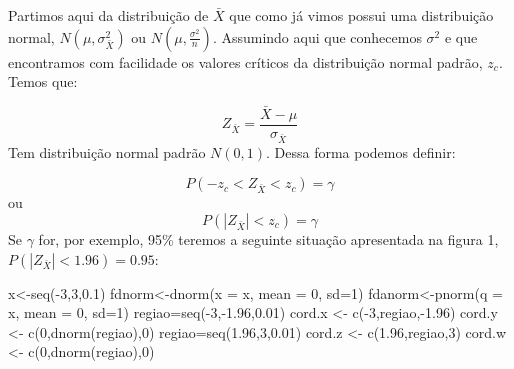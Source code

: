 \documentclass[
  letterpaper,
  DIV=11,
  numbers=noendperiod]{scrartcl}
\newenvironment{Shaded}{\begin{snugshade}}{\end{snugshade}}
\newcommand{\AttributeTok}[1]{\textcolor[rgb]{0.40,0.45,0.13}{#1}}
\newcommand{\DecValTok}[1]{\textcolor[rgb]{0.68,0.00,0.00}{#1}}
\newcommand{\FloatTok}[1]{\textcolor[rgb]{0.68,0.00,0.00}{#1}}
\newcommand{\FunctionTok}[1]{\textcolor[rgb]{0.28,0.35,0.67}{#1}}
\newcommand{\NormalTok}[1]{\textcolor[rgb]{0.00,0.23,0.31}{#1}}
\newcommand{\OtherTok}[1]{\textcolor[rgb]{0.00,0.23,0.31}{#1}}
\newcommand{\SpecialCharTok}[1]{\textcolor[rgb]{0.37,0.37,0.37}{#1}}
\begin{document}
Partimos aqui da distribuição de \(\bar{X}\) que como já vimos possui
uma distribuição normal, \(N(\mu,\sigma_{\bar{X}}^2)\) ou
\(N(\mu,\frac{\sigma^2}{n})\). Assumindo aqui que conhecemos
\(\sigma^2\) e que encontramos com facilidade os valores críticos da
distribuição normal padrão, \(z_c\). Temos que:

\[Z_{\bar{X}}=\frac{\bar{X}-\mu}{\sigma_{\bar{X}}}\] Tem distribuição
normal padrão \(N(0,1)\). Dessa forma podemos definir:

\[P(-z_c<Z_{\bar{X}}<z_c)=\gamma\] ou \[P(|Z_{\bar{X}}|<z_c)=\gamma\] Se
\(\gamma\) for, por exemplo, 95\% teremos a seguinte situação
apresentada na figura 1, \(P(|Z_{\bar{X}}|<1.96)=0.95\):

\begin{Shaded}
\begin{Highlighting}[]
\NormalTok{x}\OtherTok{\textless{}{-}}\FunctionTok{seq}\NormalTok{(}\SpecialCharTok{{-}}\DecValTok{3}\NormalTok{,}\DecValTok{3}\NormalTok{,}\FloatTok{0.1}\NormalTok{) }
\NormalTok{fdnorm}\OtherTok{\textless{}{-}}\FunctionTok{dnorm}\NormalTok{(}\AttributeTok{x =}\NormalTok{ x, }\AttributeTok{mean =} \DecValTok{0}\NormalTok{, }\AttributeTok{sd=}\DecValTok{1}\NormalTok{)   }
\NormalTok{fdanorm}\OtherTok{\textless{}{-}}\FunctionTok{pnorm}\NormalTok{(}\AttributeTok{q =}\NormalTok{ x, }\AttributeTok{mean =} \DecValTok{0}\NormalTok{, }\AttributeTok{sd=}\DecValTok{1}\NormalTok{)}
\NormalTok{regiao}\OtherTok{=}\FunctionTok{seq}\NormalTok{(}\SpecialCharTok{{-}}\DecValTok{3}\NormalTok{,}\SpecialCharTok{{-}}\FloatTok{1.96}\NormalTok{,}\FloatTok{0.01}\NormalTok{)}
\NormalTok{cord.x }\OtherTok{\textless{}{-}} \FunctionTok{c}\NormalTok{(}\SpecialCharTok{{-}}\DecValTok{3}\NormalTok{,regiao,}\SpecialCharTok{{-}}\FloatTok{1.96}\NormalTok{)}
\NormalTok{cord.y }\OtherTok{\textless{}{-}} \FunctionTok{c}\NormalTok{(}\DecValTok{0}\NormalTok{,}\FunctionTok{dnorm}\NormalTok{(regiao),}\DecValTok{0}\NormalTok{) }
\NormalTok{regiao}\OtherTok{=}\FunctionTok{seq}\NormalTok{(}\FloatTok{1.96}\NormalTok{,}\DecValTok{3}\NormalTok{,}\FloatTok{0.01}\NormalTok{)}
\NormalTok{cord.z }\OtherTok{\textless{}{-}} \FunctionTok{c}\NormalTok{(}\FloatTok{1.96}\NormalTok{,regiao,}\DecValTok{3}\NormalTok{)}
\NormalTok{cord.w }\OtherTok{\textless{}{-}} \FunctionTok{c}\NormalTok{(}\DecValTok{0}\NormalTok{,}\FunctionTok{dnorm}\NormalTok{(regiao),}\DecValTok{0}\NormalTok{) }


\end{Highlighting}
\end{Shaded}
\end{document}
